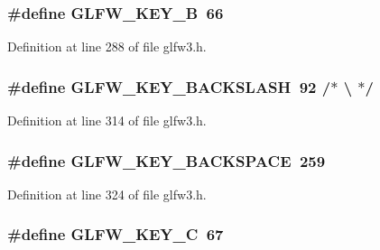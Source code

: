 \subsubsection[{G\+L\+F\+W\+\_\+\+K\+E\+Y\+\_\+\+B}]{\setlength{\rightskip}{0pt plus 5cm}\#define G\+L\+F\+W\+\_\+\+K\+E\+Y\+\_\+\+B~66}\label{group__keys_ga8e3fb647ff3aca9e8dbf14fe66332941}


Definition at line 288 of file glfw3.\+h.

\hypertarget{group__keys_gab8155ea99d1ab27ff56f24f8dc73f8d1}{}
\subsubsection[{G\+L\+F\+W\+\_\+\+K\+E\+Y\+\_\+\+B\+A\+C\+K\+S\+L\+A\+S\+H}]{\setlength{\rightskip}{0pt plus 5cm}\#define G\+L\+F\+W\+\_\+\+K\+E\+Y\+\_\+\+B\+A\+C\+K\+S\+L\+A\+S\+H~92  /$\ast$ \textbackslash{} $\ast$/}\label{group__keys_gab8155ea99d1ab27ff56f24f8dc73f8d1}


Definition at line 314 of file glfw3.\+h.

\hypertarget{group__keys_ga6c0df1fe2f156bbd5a98c66d76ff3635}{}
\subsubsection[{G\+L\+F\+W\+\_\+\+K\+E\+Y\+\_\+\+B\+A\+C\+K\+S\+P\+A\+C\+E}]{\setlength{\rightskip}{0pt plus 5cm}\#define G\+L\+F\+W\+\_\+\+K\+E\+Y\+\_\+\+B\+A\+C\+K\+S\+P\+A\+C\+E~259}\label{group__keys_ga6c0df1fe2f156bbd5a98c66d76ff3635}


Definition at line 324 of file glfw3.\+h.

\hypertarget{group__keys_ga00ccf3475d9ee2e679480d540d554669}{}
\subsubsection[{G\+L\+F\+W\+\_\+\+K\+E\+Y\+\_\+\+C}]{\setlength{\rightskip}{0pt plus 5cm}\#define G\+L\+F\+W\+\_\+\+K\+E\+Y\+\_\+\+C~67}\label{group__keys_ga00ccf3475d9ee2e679480d540d554669}


